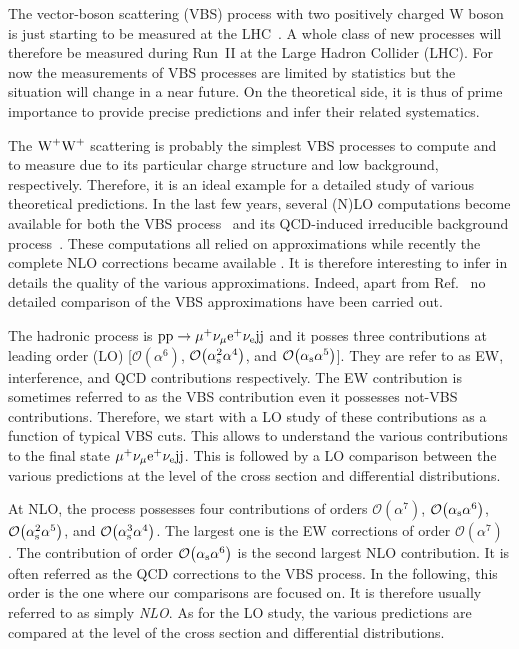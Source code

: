 The vector-boson scattering (VBS) process with two positively charged W boson is just starting to be measured at the LHC~\cite{Aad:2014zda,Aaboud:2016ffv,Khachatryan:2014sta}.
A whole class of new processes will therefore be measured during Run~II at the Large Hadron Collider (LHC).
For now the measurements of VBS processes are limited by statistics but the situation will change in a near future.
On the theoretical side, it is thus of prime importance to provide precise predictions and infer their related systematics.

The $\text{W}^+\text{W}^+$ scattering is probably the simplest VBS processes to compute and to measure due to its particular charge structure and low background, respectively.
Therefore, it is an ideal example for a detailed study of various theoretical predictions.
In the last few years, several (N)LO computations become available for both the VBS process~\cite{Jager:2009xx,Jager:2011ms,Denner:2012dz,Rauch:2016pai} and its QCD-induced irreducible background
process~\cite{Melia:2010bm,Melia:2011gk,Campanario:2013gea,Baglio:2014uba,Rauch:2016pai}.
These computations all relied on approximations while recently the complete NLO corrections became available \cite{Biedermann:2017bss}.
It is therefore interesting to infer in details the quality of the various approximations.
Indeed, apart from Ref.~\cite{Biedermann:2017bss}  no detailed comparison of the VBS approximations have been carried out.

The hadronic process is ${\rm p}{\rm p}\to\mu^+\nu_\mu{\rm e}^+\nu_{\rm e}{\rm j}{\rm j}$ and it posses three contributions at leading order (LO) 
[$\mathcal{O}{\left(\alpha^{6}\right)}$, $\mathcal{O}{\left(\alpha_\text{s}^{2}\alpha^{4}\right)}$, and $\mathcal{O}{\left(\alpha_{\rm s}\alpha^{5}\right)}$].
They are refer to as EW, interference, and QCD contributions respectively.
The EW contribution is sometimes referred to as the VBS contribution even it possesses not-VBS contributions.
Therefore, we start with a LO study of these contributions as a function of typical VBS cuts.
This allows to understand the various contributions to the final state $\mu^+\nu_\mu{\rm e}^+\nu_{\rm e}{\rm j}{\rm j}$.
This is followed by a LO comparison between the various predictions at the level of the cross section and differential distributions.

At NLO, the process possesses four contributions of orders 
$\mathcal{O}{\left(\alpha^{7}\right)}$,
$\mathcal{O}{\left(\alpha_\text{s}\alpha^{6}\right)}$,
$\mathcal{O}{\left(\alpha_\text{s}^{2}\alpha^{5}\right)}$, and
$\mathcal{O}{\left(\alpha_\text{s}^{3}\alpha^{4}\right)}$.
The largest one is the EW corrections of order $\mathcal{O}{\left(\alpha^{7}\right)}$ \cite{Biedermann:2016yds,Biedermann:2017bss}.
The contribution of order $\mathcal{O}{\left(\alpha_\text{s}\alpha^{6}\right)}$ is the second largest NLO contribution.
It is often referred as the QCD corrections to the VBS process.
In the following, this order is the one where our comparisons are focused on.
It is therefore usually referred to as simply \emph{NLO}.
As for the LO study, the various predictions are compared at the level of the cross section and differential distributions.

